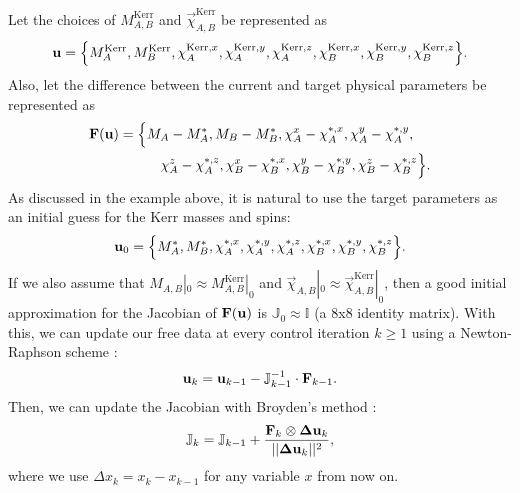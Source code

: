 \documentclass{../document}
\begin{document}
  Let the choices of $M^\text{Kerr}_{A,B}$ and $\vec\chi^\text{Kerr}_{A,B}$ be represented as
  \begin{equation}
    {\bf u} = \Big\{ M^\text{Kerr}_A, M^\text{Kerr}_B, \chi^{\text{Kerr},x}_A, \chi^{\text{Kerr},y}_A, \chi^{\text{Kerr},z}_A, \chi^{\text{Kerr},x}_B, \chi^{\text{Kerr},y}_B, \chi^{\text{Kerr},z}_B \Big\}.
  \end{equation}
  Also, let the difference between the current and target physical parameters be represented as
  \begin{equation}
    \begin{aligned}
      {\bf F}({\bf u}) &= \Big\{ M_A - M^*_A, M_B - M^*_B, \chi^x_A - \chi^{*,x}_A, \chi^y_A - \chi^{*,y}_A, \\
      &\qquad\quad \chi^z_A - \chi^{*,z}_A, \chi^x_B - \chi^{*,x}_B, \chi^y_B - \chi^{*,y}_B, \chi^z_B - \chi^{*,z}_B \Big\}.
    \end{aligned}
  \end{equation}
  As discussed in the example above, it is natural to use the target parameters as an initial guess for the Kerr masses and spins:
  \begin{equation}
    {\bf u}_0 = \Big\{ M^*_A, M^*_B, \chi^{*,x}_A, \chi^{*,y}_A, \chi^{*,z}_A, \chi^{*,x}_B, \chi^{*,y}_B, \chi^{*,z}_B \Big\}.
  \end{equation}
  If we also assume that $M_{A,B}|_0 \approx M^\text{Kerr}_{A,B}|_0$ and $\vec\chi_{A,B}|_0 \approx \vec\chi^\text{Kerr}_{A,B}|_0$, then a good initial approximation for the Jacobian of ${\bf F}({\bf u})$ is $\mathbb{J}_0 \approx \mathbb{I}$ (a 8x8 identity matrix). With this, we can update our free data at every control iteration $k \geq 1$ using a Newton-Raphson scheme \cite{NumericalRecipes}:
  \begin{equation}
    {\bf u}_k = {\bf u}_{k-1} - \mathbb{J}^{-1}_{k-1} \cdot {\bf F}_{k-1}.
  \end{equation}
  Then, we can update the Jacobian with Broyden's method \cite{NumericalRecipes}:
  \begin{equation}
    \mathbb{J}_k = \mathbb{J}_{k-1} + \frac{{\bf F}_k \otimes {\bf \Delta u}_k}{||{\bf \Delta u}_k||^2},
  \end{equation}
  where we use $\Delta x_k = x_k - x_{k-1}$ for any variable $x$ from now on.
\end{document}
